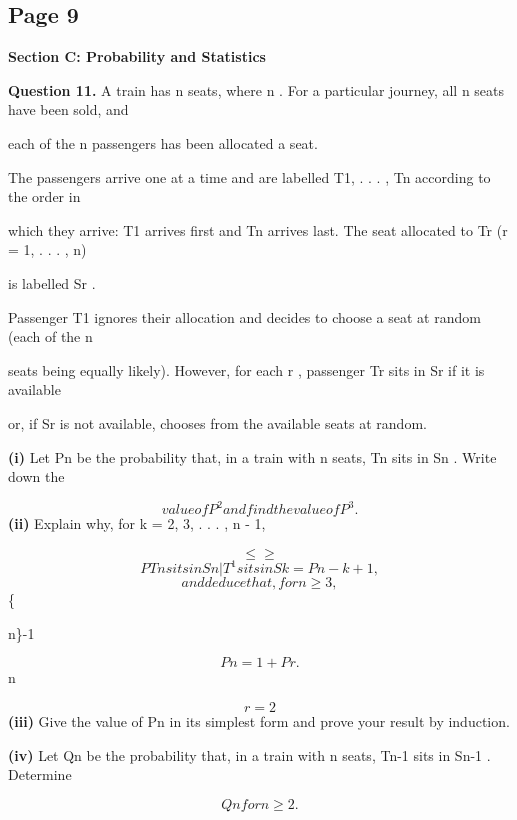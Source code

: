 \documentclass[12pt]{article}
\begin{document}
\subsection*{Page 9}
\begin{flushleft}
\bigskip\textbf{Section C: Probability and Statistics}\par
\bigskip\textbf{Question 11.} A train has n seats, where n . For a particular journey, all n seats have been sold, and\par
each of the n passengers has been allocated a seat.\par
The passengers arrive one at a time and are labelled T1, . . . , Tn according to the order in\par
which they arrive: T1 arrives first and Tn arrives last. The seat allocated to Tr (r = 1, . . . , n)\par
is labelled Sr .\par
Passenger T1 ignores their allocation and decides to choose a seat at random (each of the n\par
seats being equally likely). However, for each r , passenger Tr sits in Sr if it is available\par
or, if Sr is not available, chooses from the available seats at random.\par
\textbf{(i)} Let Pn be the probability that, in a train with n seats, Tn sits in Sn . Write down the\par
\[value of P^2 and find the value of P^3 .\]
\textbf{(ii)} Explain why, for k = 2, 3, . . . , n - 1,\par
\[\leq \geq\]
\[P Tn sits in Sn | T^1 sits in Sk = Pn-k+1 ,\]
\[and deduce that, for n \geq 3,\]
\{ \alpha\par
n\}-1\par
\[Pn = 1 + Pr .\]
n\par
\[r=2\]
\textbf{(iii)} Give the value of Pn in its simplest form and prove your result by induction.\par
\textbf{(iv)} Let Qn be the probability that, in a train with n seats, Tn-1 sits in Sn-1 . Determine\par
\[Qn for n \geq 2.\]
\end{flushleft}
\end{document}
